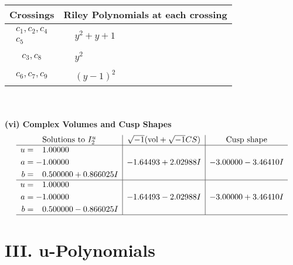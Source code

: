 \documentclass[1p]{elsarticle_modified}
\theoremstyle{definition}
\newcommand{\I}{\sqrt{-1}}
\begin{document}
\begin{tabular}{m{50pt}|m{274pt}}
Crossings & \hspace{64pt}Riley Polynomials at each crossing \\
\hline $$\begin{aligned}c_{1},c_{2},c_{4}\\c_{5}\end{aligned}$$&$\begin{aligned}
&y^2+y+1
\end{aligned}$\\
\hline $$\begin{aligned}c_{3},c_{8}\end{aligned}$$&$\begin{aligned}
&y^2
\end{aligned}$\\
\hline $$\begin{aligned}c_{6},c_{7},c_{9}\end{aligned}$$&$\begin{aligned}
&(y-1)^2
\end{aligned}$\\
\hline
\end{tabular}\\~\\
\newpage\flushleft \textbf{(vi) Complex Volumes and Cusp Shapes}
$$\begin{array}{c|c|c}  
\text{Solutions to }I^u_{2}& \I (\text{vol} + \sqrt{-1}CS) & \text{Cusp shape}\\
 \hline 
\begin{aligned}
u &= \phantom{-}1.00000\phantom{ +0.000000I} \\
a &= -1.00000\phantom{ +0.000000I} \\
b &= \phantom{-}0.500000 + 0.866025 I\end{aligned}
 & -1.64493 + 2.02988 I & -3.00000 - 3.46410 I \\ \hline\begin{aligned}
u &= \phantom{-}1.00000\phantom{ +0.000000I} \\
a &= -1.00000\phantom{ +0.000000I} \\
b &= \phantom{-}0.500000 - 0.866025 I\end{aligned}
 & -1.64493 - 2.02988 I & -3.00000 + 3.46410 I\\
 \hline 
 \end{array}$$\newpage
\newpage\renewcommand{\arraystretch}{1}
\centering \section*{ III. u-Polynomials}
\end{document}
